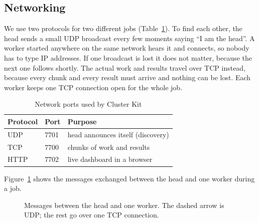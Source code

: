 \documentclass[11pt,a4paper]{article}
\let\oldsubsection\subsection
\renewcommand{\subsection}{\Needspace{5\baselineskip}\oldsubsection}
\begin{document}
\subsection{Networking}
We use two protocols for two different jobs (Table~\ref{tab:net}). To find each other, the head sends a small UDP broadcast every few moments saying \enquote{I am the head}. A worker started anywhere on the same network hears it and connects, so nobody has to type IP addresses. If one broadcast is lost it does not matter, because the next one follows shortly. The actual work and results travel over TCP instead, because every chunk and every result must arrive and nothing can be lost. Each worker keeps one TCP connection open for the whole job.

\begin{table}[H]\centering
\caption{Network ports used by Cluster Kit}\label{tab:net}
\begin{tabular}{lll}
\toprule
Protocol & Port & Purpose\\
\midrule
UDP & 7701 & head announces itself (discovery)\\
TCP & 7700 & chunks of work and results\\
HTTP & 7702 & live dashboard in a browser\\
\bottomrule
\end{tabular}
\end{table}

Figure~\ref{fig:seq} shows the messages exchanged between the head and one worker during a job.

\begin{figure}[H]\centering
{}
\caption{Messages between the head and one worker. The dashed arrow is UDP; the rest go over one TCP connection.}
\label{fig:seq}
\end{figure}
\end{document}
